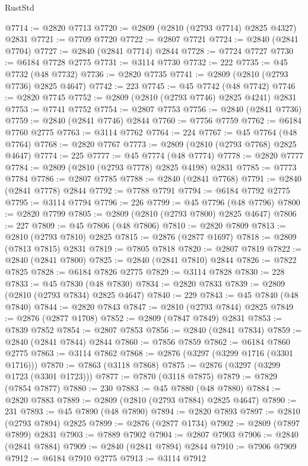 \begin{lexlean}{RustStd}
\begin{coremodule}
@7714 := @2820 @7713
@7720 := @2809 (@2810 (@2793 @7714) @2825 @4327) @2831
@7721 := @7709 @7720
@7722 := @2807 @7721
@7724 := @2840 (@2841 @7704)
@7727 := @2840 (@2841 @7714) @2844
@7728 := @7724 @7727
@7730 := @6184 @7728 @2775
@7731 := @3114 @7730
@7732 := 222
@7735 := @45 @7732 (@48 @7732)
@7736 := @2820 @7735
@7741 := @2809 (@2810 (@2793 @7736) @2825 @4647)
@7742 := 223
@7745 := @45 @7742 (@48 @7742)
@7746 := @2820 @7745
@7752 := @2809 (@2810 (@2793 @7746) @2825 @4241) @2831
@7753 := @7741 @7752
@7754 := @2807 @7753
@7756 := @2840 (@2841 @7736)
@7759 := @2840 (@2841 @7746) @2844
@7760 := @7756 @7759
@7762 := @6184 @7760 @2775
@7763 := @3114 @7762
@7764 := 224
@7767 := @45 @7764 (@48 @7764)
@7768 := @2820 @7767
@7773 := @2809 (@2810 (@2793 @7768) @2825 @4647)
@7774 := 225
@7777 := @45 @7774 (@48 @7774)
@7778 := @2820 @7777
@7784 := @2809 (@2810 (@2793 @7778) @2825 @4198) @2831
@7785 := @7773 @7784
@7786 := @2807 @7785
@7788 := @2840 (@2841 @7768)
@7791 := @2840 (@2841 @7778) @2844
@7792 := @7788 @7791
@7794 := @6184 @7792 @2775
@7795 := @3114 @7794
@7796 := 226
@7799 := @45 @7796 (@48 @7796)
@7800 := @2820 @7799
@7805 := @2809 (@2810 (@2793 @7800) @2825 @4647)
@7806 := 227
@7809 := @45 @7806 (@48 @7806)
@7810 := @2820 @7809
@7813 := @2810 (@2793 @7810) @2825
@7815 := @2876 (@2877 @1697)
@7818 := @2809 (@7813 @7815) @2831
@7819 := @7805 @7818
@7820 := @2807 @7819
@7822 := @2840 (@2841 @7800)
@7825 := @2840 (@2841 @7810) @2844
@7826 := @7822 @7825
@7828 := @6184 @7826 @2775
@7829 := @3114 @7828
@7830 := 228
@7833 := @45 @7830 (@48 @7830)
@7834 := @2820 @7833
@7839 := @2809 (@2810 (@2793 @7834) @2825 @4647)
@7840 := 229
@7843 := @45 @7840 (@48 @7840)
@7844 := @2820 @7843
@7847 := @2810 (@2793 @7844) @2825
@7849 := @2876 (@2877 @1708)
@7852 := @2809 (@7847 @7849) @2831
@7853 := @7839 @7852
@7854 := @2807 @7853
@7856 := @2840 (@2841 @7834)
@7859 := @2840 (@2841 @7844) @2844
@7860 := @7856 @7859
@7862 := @6184 @7860 @2775
@7863 := @3114 @7862
@7868 := @2876 (@3297 (@3299 @1716 (@3301 @1716)))
@7870 := @7863 (@3118 @7868)
@7875 := @2876 (@3297 (@3299 @1723 (@3301 @1723)))
@7877 := @7870 (@3118 @7875)
@7879 := @7829 (@7854 @7877)
@7880 := 230
@7883 := @45 @7880 (@48 @7880)
@7884 := @2820 @7883
@7889 := @2809 (@2810 (@2793 @7884) @2825 @4647)
@7890 := 231
@7893 := @45 @7890 (@48 @7890)
@7894 := @2820 @7893
@7897 := @2810 (@2793 @7894) @2825
@7899 := @2876 (@2877 @1734)
@7902 := @2809 (@7897 @7899) @2831
@7903 := @7889 @7902
@7904 := @2807 @7903
@7906 := @2840 (@2841 @7884)
@7909 := @2840 (@2841 @7894) @2844
@7910 := @7906 @7909
@7912 := @6184 @7910 @2775
@7913 := @3114 @7912

\end{coremodule}
\end{lexlean}
